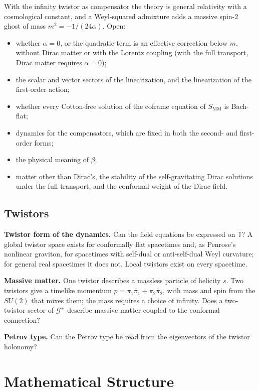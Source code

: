 \documentclass[11pt,a4paper]{article}
\newcommand{\T}{\mathbb{T}}
\newcommand{\G}{\mathcal{G}}
\begin{document}
With the infinity twistor as compensator the theory is general
relativity with a cosmological constant, and a Weyl-squared admixture
adds a massive spin-2 ghost of mass \(m^2=-1/(24\alpha)\). Open:
\begin{itemize}
    \item whether \(\alpha=0\), or the quadratic term is an effective
    correction below \(m\), without Dirac matter or with the Lorentz
    coupling (with the full transport, Dirac matter requires
    \(\alpha=0\));
    \item the scalar and vector sectors of the linearization, and the
    linearization of the first-order action;
    \item whether every Cotton-free solution of the coframe equation of
    \(S_{\mathrm{MM}}\) is Bach-flat;
    \item dynamics for the compensators, which are fixed in both the
    second- and first-order forms;
    \item the physical meaning of \(\beta\);
    \item matter other than Dirac's, the stability of the
    self-gravitating Dirac solutions under the full transport, and the
    conformal weight of the Dirac field.
\end{itemize}

\subsection{Twistors}

\textbf{Twistor form of the dynamics.} Can the field equations be
expressed on \(\T\)? A global twistor space exists for conformally flat
spacetimes and, as Penrose's nonlinear graviton, for spacetimes with
self-dual or anti-self-dual Weyl curvature; for general real
spacetimes it does not. Local twistors exist on every spacetime.

\textbf{Massive matter.} One twistor describes a massless particle of
helicity \(s\). Two twistors give a timelike momentum
\(p=\pi_1\bar\pi_1+\pi_2\bar\pi_2\), with mass and spin from the
\(SU(2)\) that mixes them; the mass requires a choice of infinity.
Does a two-twistor sector of \(\G^+\) describe massive matter coupled
to the conformal connection?

\textbf{Petrov type.} Can the Petrov type be read from the
eigenvectors of the twistor holonomy?

\section{Mathematical Structure}
\end{document}
